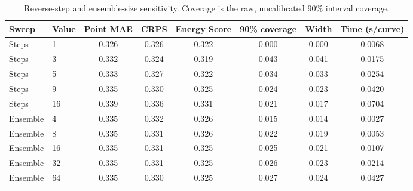 \begin{table}[t]
\caption{Reverse-step and ensemble-size sensitivity. Coverage is the raw, uncalibrated 90\% interval coverage.}
\label{tab:sampling_sensitivity}
\centering
\scriptsize
\setlength{\tabcolsep}{5pt}
\begin{tabular}{llcccccc}
\toprule
Sweep & Value & Point MAE & CRPS & Energy Score & 90\% coverage & Width & Time (s/curve) \\
\midrule
Steps & 1 & 0.326 & 0.326 & 0.322 & 0.000 & 0.000 & 0.0068 \\
Steps & 3 & 0.332 & 0.324 & 0.319 & 0.043 & 0.041 & 0.0175 \\
Steps & 5 & 0.333 & 0.327 & 0.322 & 0.034 & 0.033 & 0.0254 \\
Steps & 9 & 0.335 & 0.330 & 0.325 & 0.024 & 0.023 & 0.0420 \\
Steps & 16 & 0.339 & 0.336 & 0.331 & 0.021 & 0.017 & 0.0704 \\
\addlinespace[3pt]
Ensemble & 4 & 0.335 & 0.332 & 0.326 & 0.015 & 0.014 & 0.0027 \\
Ensemble & 8 & 0.335 & 0.331 & 0.326 & 0.022 & 0.019 & 0.0053 \\
Ensemble & 16 & 0.335 & 0.331 & 0.325 & 0.025 & 0.021 & 0.0107 \\
Ensemble & 32 & 0.335 & 0.331 & 0.325 & 0.026 & 0.023 & 0.0214 \\
Ensemble & 64 & 0.335 & 0.330 & 0.325 & 0.027 & 0.024 & 0.0427 \\
\bottomrule
\end{tabular}
\end{table}
